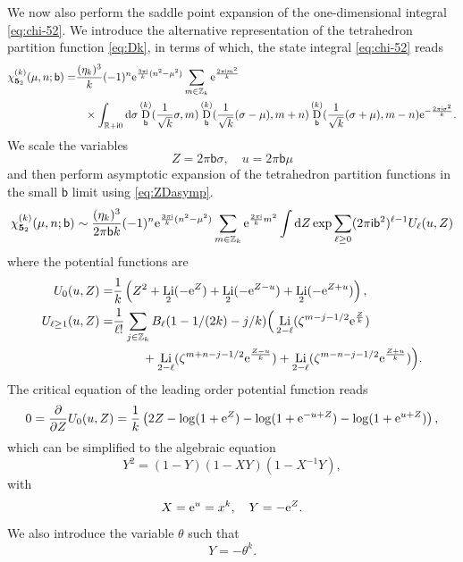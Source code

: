\documentclass[a4paper,11pt]{article}	%
\DeclareMathOperator{\Li}{Li}
\def\md{\mathbf}
\def\ms{\mathsf}
\def\IR{\mathbb{R}}
\def\IZ{\mathbb{Z}}
\newcommand{\pd}{\partial}
\newcommand{\re}{{\rm e}}
\newcommand{\ri}{{\mathsf{i}}}
\newcommand{\rd}{{\rm d}}
\newcommand{\nn}{\nonumber \\}
\newcommand{\bb}{\ms{b}}
\newcommand{\knot}[1]{\md{#1}}
\DeclareMathOperator{\DD}{\text{D}}
\begin{document}
We now also perform the saddle point expansion of the one-dimensional
integral \eqref{eq:chi-52}.  We introduce the alternative
representation of the tetrahedron partition function \eqref{eq:Dk}, in
terms of which, the state integral \eqref{eq:chi-52} reads
\begin{align}
  \chi^{(k)}_{\knot{5}_2}(\mu,n;\bb) =
  &\frac{(\eta_k)^3}{k}(-1)^n\re^{\frac{3\pi\ri}{k}(n^2-\mu^2)}
    \sum_{m\in\IZ_k}\re^{\frac{2\pi\ri m^2}{k}}\nn
  &\phantom{=}\times\int_{\IR+\ri 0}\rd \sigma
    \DD^{(k)}_\bb(\frac{1}{\sqrt{k}}\sigma,m)
    \DD^{(k)}_\bb(\frac{1}{\sqrt{k}}(\sigma-\mu),m+n)
    \DD^{(k)}_\bb(\frac{1}{\sqrt{k}}(\sigma+\mu),m-n) \re^{-\frac{2\pi\ri\sigma^2}{k}}.
\end{align}
%
We scale the variables
\begin{equation}
  Z = 2\pi\bb \sigma,\quad u =2\pi\bb \mu
\end{equation}
and then perform asymptotic expansion of the tetrahedron partition
functions in the small $\bb$ limit using \eqref{eq:ZDasymp}.
\begin{equation}
  \chi_{\knot{5}_2}^{(k)}(\mu,n;\bb) \sim
  \frac{(\eta_k)^3}{2\pi\bb k}(-1)^n \re^{\frac{3\pi\ri}{k}(n^2-\mu^2)}
  \sum_{m\in\IZ_k}
  \re^{\frac{2\pi\ri}{k}m^2}
  \int \rd Z \exp\sum_{\ell\geq 0}(2\pi\ri\bb^2)^{\ell-1} U_\ell(u,Z)
\end{equation}
where the potential functions are
\begin{subequations}
  \begin{align}
    U_0(u,Z) =
    &\frac{1}{k}\left(
      Z^2  +
      \Li_2(-\re^{Z}) + \Li_2(-\re^{Z-u}) + \Li_2(-\re^{Z+u})\right),\\
    U_{\ell\geq 1}(u,Z) =
    &\frac{1}{\ell!}\sum_{j\in\IZ_k}B_\ell(1-1/(2k)-j/k)
      \Big(
      \Li_{2-\ell}(\zeta^{m-j-1/2} \re^{\frac{Z}{k}})\nn
    &\phantom{===}+\Li_{2-\ell}(\zeta^{m+n-j-1/2}\re^{\frac{Z-u}{k}})
      +\Li_{2-\ell}(\zeta^{m-n-j-1/2}\re^{\frac{Z+u}{k}})
      \Big).
  \end{align}
\end{subequations}
The critical equation of the leading order potential function reads
\begin{equation}
  0 = \frac{\pd}{\pd Z}U_0(u,Z)
  =\frac{1}{k}\left( 2Z - \log(1+\re^{Z})
   - \log(1+\re^{-u+Z}) - \log(1+\re^{u+Z})\right),
\end{equation}
which can be simplified to the algebraic equation
\begin{equation}
  Y^2 = (1-Y)(1-XY)(1-X^{-1}Y),
  \label{eq:alcr.52}
\end{equation}
with
\begin{equation}
  X = \re^u = x^k,\quad Y = - \re^{Z}.
\end{equation}
We also introduce the variable $\theta$ such that
\begin{equation}
  Y  = -\theta^k.
\end{equation}
\end{document}
